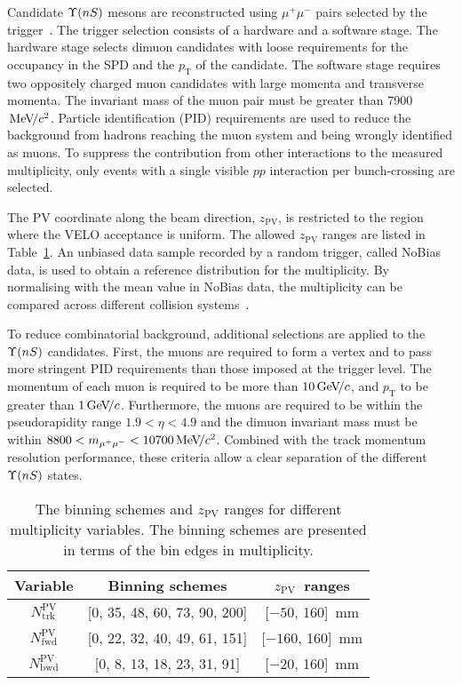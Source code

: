 \documentclass[12pt,a4paper]{article}
\def\pvt{N_{\mathrm{trk}}^{\mathrm{PV}}}
\def\bkt{N_{\mathrm{bwd}}^{\mathrm{PV}}}
\def\fwt{N_{\mathrm{fwd}}^{\mathrm{PV}}}
\def\Pmu         {\ensuremath{\upmu}\xspace}
\def\Pmu         {\ensuremath{\mu}\xspace}
\def\mumu       {{\ensuremath{\Pmu^+\Pmu^-}}\xspace}
\newcommand{\aunit}[1]{\ensuremath{\text{\,#1}}}
\newcommand{\gevc}{\ensuremath{\aunit{Ge\kern -0.1em V\!/}c}\xspace}
\newcommand{\mevcc}{\ensuremath{\aunit{Me\kern -0.1em V\!/}c^2}\xspace}
\def\pt         {\ensuremath{p_{\mathrm{T}}}\xspace}
\begin{document}
Candidate  $\Upsilon{(nS)}$ mesons are reconstructed using $\mumu$  pairs selected by the trigger~\cite{LHCb-DP-2019-001}. 
The trigger selection consists of a hardware and a software stage. The hardware stage selects dimuon candidates with loose requirements for the occupancy in the SPD and the \pt of the candidate. 
The software stage requires two oppositely charged muon candidates with large momenta and transverse momenta. 
The invariant mass of the muon pair must be greater than 7900\,\mevcc. 
Particle identification (PID) requirements are used to reduce the background from hadrons reaching the muon system and being wrongly identified as muons. To suppress the contribution from other interactions to the measured multiplicity, 
only events with a single visible $pp$ interaction per bunch-crossing are selected.

The PV coordinate along the beam direction, $z_\mathrm{PV}$, is restricted to the region where the VELO acceptance is uniform. The allowed $z_\mathrm{PV}$ ranges are listed in Table~\ref{MulScheme}. 
An unbiased data sample recorded by a random trigger, called \mbox{NoBias} data, is used to obtain a reference distribution for the multiplicity. By normalising with the mean value in \mbox{NoBias} data, the multiplicity can be compared across different collision systems~\cite{KOBA1972317}.




To reduce combinatorial background, additional selections are applied to the $\Upsilon{(nS)}$ candidates. 
First, the muons are required to form a vertex and to pass more stringent PID requirements than those imposed at the trigger level. 
The momentum of each muon is required to be more than $10\gevc$, and $\pt$ to be greater than $1\gevc$. 
Furthermore, the muons are required to be within the pseudorapidity range \mbox{$1.9 < \eta < 4.9$} and the dimuon invariant mass must be within \mbox{$8800< m_{\mumu} < 10700\mevcc$}. Combined with the track momentum resolution performance, these criteria allow a clear separation of the 
different $\Upsilon{(nS)}$ states.
\begin{table}[t]
    \centering
    \caption{The binning schemes and $z_\mathrm{PV}$ ranges for different multiplicity variables. The binning schemes are presented in terms of the bin edges in multiplicity.
}
    \begin{tabular}{ccc}
    \hline
    Variable & Binning schemes & $z_\mathrm{PV} $\ ranges\\
    \hline
        $\pvt$ & [0, 35, 48, 60, 73, 90, 200]  & [\phantom{1}$-50$, 160]~mm \\
$\fwt$ & [0, 22, 32, 40, 49, 61, 151]  & [$-160$, 160]~mm\\
$\bkt$ & [0, \phantom{0}8, 13, 18, 23, 31, \phantom{0}91] & [\phantom{1}$-20$, 160]~mm\\
    \hline
    \end{tabular}
    \label{MulScheme}
\end{table}
\end{document}
